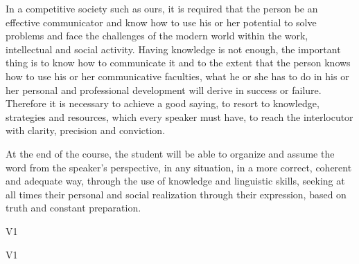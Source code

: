 \begin{syllabus}


\begin{justification}
	In a competitive society such as ours, it is required that the person be an effective communicator and know how to use his or her potential to solve problems and face the challenges of the modern world within the work, intellectual and social activity. Having knowledge is not enough, the important thing is to know how to communicate it and to the extent that the person knows how to use his or her communicative faculties, what he or she has to do in his or her personal and professional development will derive in success or failure. Therefore it is necessary to achieve a good saying, to resort to knowledge, strategies and resources, which every speaker must have, to reach the interlocutor with clarity, precision and conviction.
\end{justification}

\begin{goals}
\item At the end of the course, the student will be able to organize and assume the word from the speaker's perspective, in any situation, in a more correct, coherent and adequate way, through the use of knowledge and linguistic skills, seeking at all times their personal and social realization through their expression, based on truth and constant preparation.
\end{goals}

\begin{outcomes}{V1}
    \item {}
	\item {}
    \item {}
\end{outcomes}

\begin{specificoutcomes}{V1}
	\item {}
    \item {}
	\item {}
	\item {}
    \item {}
    \item {}
    \item {}
\end{specificoutcomes}


\end{syllabus}

